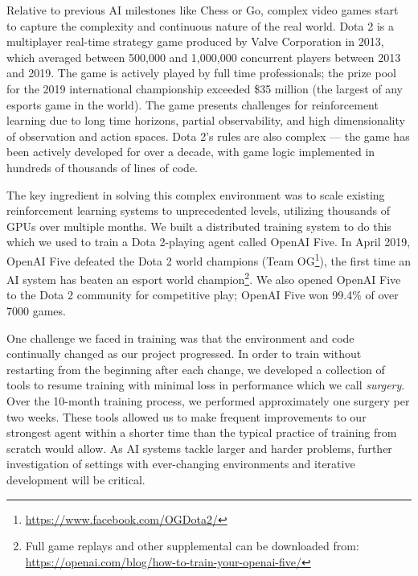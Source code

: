 \documentclass[11pt]{article}
\newcommand{\dota}{Dota 2\xspace}
\newcommand{\openaifive}{OpenAI Five\xspace}
\begin{document}
Relative to previous AI milestones like Chess or Go, complex video games start to capture the complexity and continuous nature of the real world. 
\dota is a multiplayer real-time strategy game produced by Valve Corporation in 2013, which averaged between 500,000 and 1,000,000 concurrent players between 2013 and 2019. 
The game is actively played by full time professionals; the prize pool for the 2019 international championship exceeded \$35 million (the largest of any esports game in the world)\cite{wiki:dota2, wiki:ti2018}.
The game presents challenges for reinforcement learning due to
long time horizons, partial observability, and high dimensionality of observation and action spaces.
\dota's rules are also complex --- the game has been actively developed for over a decade, with game logic implemented in hundreds of thousands of lines of code.

The key ingredient in solving this complex environment was to scale existing reinforcement learning systems to unprecedented levels, utilizing thousands of GPUs over multiple months. 
We built a distributed training system to do this which we used to train a \dota-playing agent called \openaifive. 
In April 2019, \openaifive defeated the \dota world champions (Team OG\footnote{\url{https://www.facebook.com/OGDota2/}}), the first time an AI system has beaten an esport world champion\footnote{Full game replays and other supplemental can be downloaded from: \url{https://openai.com/blog/how-to-train-your-openai-five/}}. We also opened \openaifive to the \dota community for competitive play; \openaifive won 99.4\% of over 7000 games.

One challenge we faced in training was that the environment and code continually changed as our project progressed. 
In order to train without restarting from the beginning after each change, we developed a collection of tools to resume training with minimal loss in performance which we call {\it surgery}. 
Over the 10-month training process, we performed approximately one surgery per two weeks. 
These tools allowed us to make frequent improvements to our strongest agent within a shorter time than the typical practice of training from scratch would allow.
As AI systems tackle larger and harder problems, further investigation of settings with ever-changing environments and iterative development will be critical.
\end{document}
